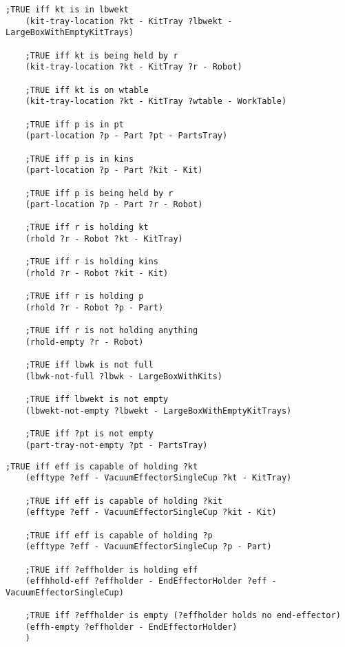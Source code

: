 \begin{appendices}
\begin{minipage}{.5\paperwidth}
\begin{mylisting}
\begin{Verbatim}[commandchars=\\\{\},commandchars=+\[\],fontsize=\small,numbersep=3pt]
	;TRUE iff kt is in lbwekt				
	(kit-tray-location ?kt - KitTray ?lbwekt - LargeBoxWithEmptyKitTrays)	

	;TRUE iff kt is being held by r
	(kit-tray-location ?kt - KitTray ?r - Robot)					
		
	;TRUE iff kt is on wtable
	(kit-tray-location ?kt - KitTray ?wtable - WorkTable)
	
	;TRUE iff p is in pt
	(part-location ?p - Part ?pt - PartsTray)					
	
	;TRUE iff p is in kins
	(part-location ?p - Part ?kit - Kit)			
		
	;TRUE iff p is being held by r
	(part-location ?p - Part ?r - Robot)	

	;TRUE iff r is holding kt						
	(rhold ?r - Robot ?kt - KitTray)	

	;TRUE iff r is holding kins					
	(rhold ?r - Robot ?kit - Kit)				
		
	;TRUE iff r is holding p
	(rhold ?r - Robot ?p - Part)					
			
	;TRUE iff r is not holding anything
	(rhold-empty ?r - Robot)							
			
	;TRUE iff lbwk is not full
	(lbwk-not-full ?lbwk - LargeBoxWithKits)
		
	;TRUE iff lbwekt is not empty
	(lbwekt-not-empty ?lbwekt - LargeBoxWithEmptyKitTrays)	
	
	;TRUE iff ?pt is not empty		
	(part-tray-not-empty ?pt - PartsTray)
\end{Verbatim}
\end{mylisting}
\end{minipage}

\begin{minipage}{.5\paperwidth}
\begin{mylisting}
\begin{Verbatim}[commandchars=\\\{\},commandchars=+\[\],fontsize=\small,numbersep=3pt]
	;TRUE iff eff is capable of holding ?kt						
	(efftype ?eff - VacuumEffectorSingleCup ?kt - KitTray)
	
	;TRUE iff eff is capable of holding ?kit
	(efftype ?eff - VacuumEffectorSingleCup ?kit - Kit)	
	
	;TRUE iff eff is capable of holding ?p
	(efftype ?eff - VacuumEffectorSingleCup ?p - Part)

	;TRUE iff ?effholder is holding eff				
	(effhhold-eff ?effholder - EndEffectorHolder ?eff - VacuumEffectorSingleCup)	

	;TRUE iff ?effholder is empty (?effholder holds no end-effector)		
	(effh-empty ?effholder - EndEffectorHolder)	
    )


\end{Verbatim}
\end{mylisting}
\end{minipage}
\end{appendices}
